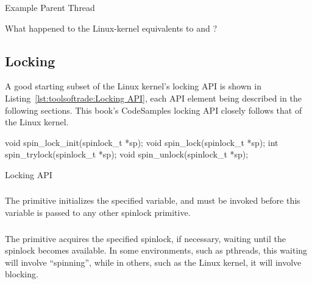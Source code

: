 \begin{listing}[tbp]

\caption{Example Parent Thread}
\label{lst:toolsoftrade:Example Parent Thread}
\end{listing}

\QuickQuiz{}
	What happened to the Linux-kernel equivalents to 
	and ?
 \QuickQuizEnd

\subsection{Locking}
\label{sec:toolsoftrade:Locking}

A good starting subset of the Linux kernel's locking API is shown in
Listing~\ref{lst:toolsoftrade:Locking API},
each API element being described in the following sections.
This book's CodeSamples locking API closely follows that of the Linux kernel.

\begin{listing}[tbp]
\begin{VerbatimL}[numbers=none]
void spin_lock_init(spinlock_t *sp);
void spin_lock(spinlock_t *sp);
int spin_trylock(spinlock_t *sp);
void spin_unlock(spinlock_t *sp);
\end{VerbatimL}
\caption{Locking API}
\label{lst:toolsoftrade:Locking API}
\end{listing}

\subsubsection{}

The  primitive initializes the specified
 variable, and must be invoked before
this variable is passed to any other spinlock primitive.

\subsubsection{}

The  primitive acquires the specified spinlock,
if necessary, waiting until the spinlock becomes available.
In some environments, such as pthreads, this waiting will involve
``spinning'', while
in others, such as the Linux kernel, it will involve blocking.

